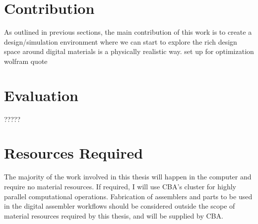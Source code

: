 {%
%
%
%
%

%
%
%

\section{Contribution}

As outlined in previous sections, the main contribution of this work is to create a design/simulation environment where we can start to explore the rich design space around digital materials is a physically realistic way.
set up for optimization
wolfram quote

\section{Evaluation}

?????

\section{Resources Required}

The majority of the work involved in this thesis will happen in the computer and require no material resources.  If required, I will use CBA's cluster for highly parallel computational operations.  Fabrication of assemblers and parts to be used in the digital assembler workflows should be considered outside the scope of material resources required by this thesis, and will be supplied by CBA.

}
